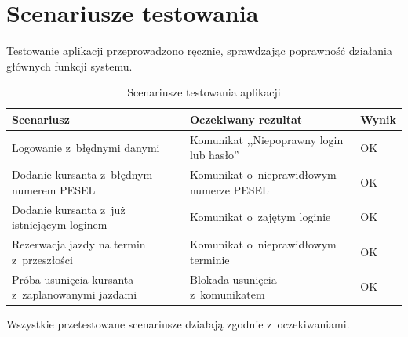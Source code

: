 \section{Scenariusze testowania}

Testowanie aplikacji przeprowadzono r\k{e}cznie, sprawdzaj\k{a}c poprawno\'{s}\'{c}
dzia\l{}ania g\l{}\'{o}wnych funkcji systemu.

\begin{table}[H]
\centering
\caption{Scenariusze testowania aplikacji}
\label{tab:testy}
\begin{tabularx}{\linewidth}{|X|X|l|}
\hline
\textbf{Scenariusz} & \textbf{Oczekiwany rezultat} & \textbf{Wynik} \\
\hline
Logowanie z~b\l{}\k{e}dnymi danymi & Komunikat ,,Niepoprawny login lub has\l{}o'' & OK \\
\hline
Dodanie kursanta z~b\l{}\k{e}dnym numerem PESEL & Komunikat o~nieprawid\l{}owym numerze PESEL & OK \\
\hline
Dodanie kursanta z~ju\.{z} istniej\k{a}cym loginem & Komunikat o~zaj\k{e}tym loginie & OK \\
\hline
Rezerwacja jazdy na termin z~przesz\l{}o\'{s}ci & Komunikat o~nieprawid\l{}owym terminie & OK \\
\hline
Pr\'{o}ba usuni\k{e}cia kursanta z~zaplanowanymi jazdami & Blokada usuni\k{e}cia z~komunikatem & OK \\
\hline
\end{tabularx}
\end{table}
\vspace{-\baselineskip}

Wszystkie przetestowane scenariusze dzia\l{}aj\k{a} zgodnie z~oczekiwaniami.
